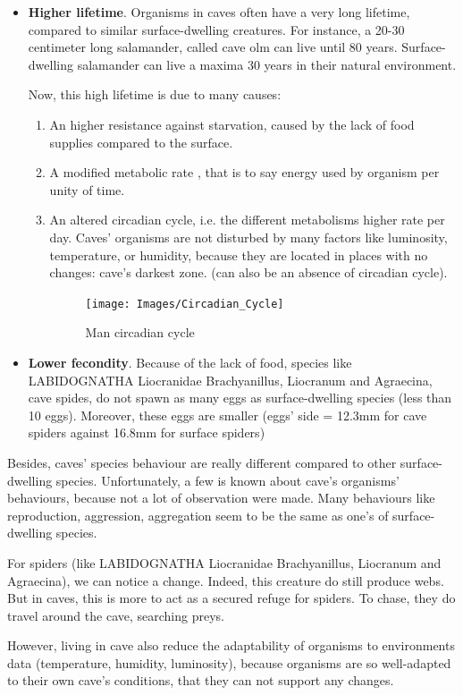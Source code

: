 \documentclass{article}
\begin{document}
\begin{itemize}[label=$\square$]
  \item \textbf{Higher lifetime}. Organisms in caves often have a very long lifetime, compared to similar surface-dwelling creatures. For instance, a 20-30 centimeter long salamander, called cave olm can live until 80 years. Surface-dwelling salamander can live a maxima 30 years in their natural environment.\par
  Now, this high lifetime is due to many causes:
  \begin{enumerate}
    \item An higher resistance against starvation, caused by the lack of food supplies compared to the surface.
    \item A modified metabolic rate , that is to say energy used by organism per unity of time.
    \item An altered circadian cycle, i.e. the different metabolisms higher rate per day. Caves’ organisms are not disturbed by many factors like luminosity, temperature, or humidity, because they are located in places with no changes: cave’s darkest zone. (can also be an absence of circadian cycle).
      \begin{figure}[!ht]
        \centering
        \texttt{[image: Images/Circadian\_Cycle]}
        \caption{Man circadian cycle \cite{CircadianCycle}}
      \end{figure}
  \end{enumerate}
  \item \textbf{Lower fecondity}. Because of the lack of food, species like LABIDOGNATHA Liocranidae Brachyanillus, Liocranum and Agraecina, cave spides, do not spawn as many eggs as surface-dwelling species (less than 10 eggs). Moreover, these eggs are smaller (eggs’ side = 12.3mm for cave spiders against 16.8mm for surface spiders)
\end{itemize}

Besides, caves’ species behaviour are really different compared to other surface-dwelling species. Unfortunately, a few is known about cave’s organisms’ behaviours, because not a lot of observation were made. Many behaviours like reproduction, aggression,  aggregation seem to be the same as one’s of surface-dwelling species.
\par
For spiders (like  LABIDOGNATHA Liocranidae Brachyanillus, Liocranum and Agraecina), we can notice a change. Indeed, this creature do still produce webs. But in caves, this is more to act as a secured refuge for spiders. To chase, they do travel around the cave, searching preys.
\par
However, living in cave also reduce the adaptability of organisms to environments data (temperature, humidity, luminosity), because organisms are so well-adapted to their own cave’s conditions, that they can not support any changes.
\end{document}
